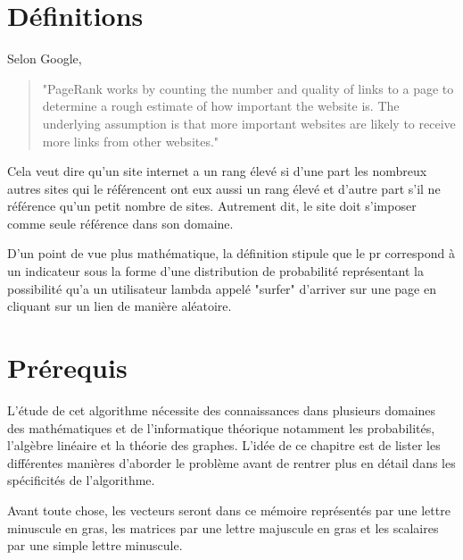 \documentclass[12pt,twoside, openright]{memoir}
\begin{document}
	\section{Définitions}
	Selon Google, 
	\begin{quote}
		"PageRank works by counting the number and quality of links to a page to determine a rough estimate of how important the website is. The underlying assumption is that more important websites are likely to receive more links from other websites."
	\end{quote}
	Cela veut dire qu'un site internet a un rang élevé si d'une part les nombreux autres sites qui le référencent ont eux aussi un rang élevé et d'autre part s'il ne référence qu'un petit nombre de sites. Autrement dit, le site doit s'imposer comme seule référence dans son domaine.\par
	D'un point de vue plus mathématique, la définition stipule que le \gls{pr} correspond à un indicateur sous la forme d'une distribution de probabilité représentant la possibilité qu'a un utilisateur lambda appelé "surfer" d'arriver sur une page en cliquant sur un lien de manière aléatoire. \cite{ref_mathpr}
	\section{Prérequis}
	L'étude de cet algorithme nécessite des connaissances dans plusieurs domaines des mathématiques et de l'informatique théorique notamment les probabilités, l'algèbre linéaire et la théorie des graphes. L'idée de ce chapitre est de lister les différentes manières d'aborder le problème avant de rentrer plus en détail dans les spécificités de l'algorithme.\par
	Avant toute chose, les vecteurs seront dans ce mémoire représentés par une lettre minuscule en gras, les matrices par une lettre majuscule en gras et les scalaires par une simple lettre minuscule.
\end{document}
